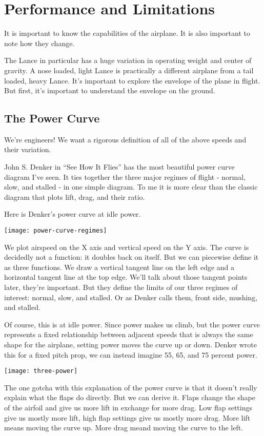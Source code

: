\chapter{Performance and Limitations}

It is important to know the capabilities of the airplane. It is also important to note how they change.

The Lance in particular has a huge variation in operating weight and center of gravity. A nose loaded, light Lance is practically a different airplane from a tail loaded, heavy Lance. It's important to explore the envelope of the plane in flight. But first, it's important to understand the envelope on the ground.


\section{The Power Curve}

We're engineers! We want a rigorous definition of all of the above speeds and their variation.

John S. Denker in ``See How It Flies'' has the most beautiful power curve diagram I've seen. It ties together the three major regimes of flight - normal, slow, and stalled - in one simple diagram. To me it is more clear than the classic diagram that plots lift, drag, and their ratio.

Here is Denker's power curve at idle power.

\texttt{[image: power-curve-regimes]}

We plot airspeed on the X axis and vertical speed on the Y axis. The curve is decidedly not a function: it doubles back on itself. But we can piecewise define it as three functions. We draw a vertical tangent line on the left edge and a horizontal tangent line at the top edge. We'll talk about those tangent points later, they're important. But they define the limits of our three regimes of interest: normal, slow, and stalled. Or as Denker calls them, front side, mushing, and stalled.

Of course, this is at idle power. Since power makes us climb, but the power curve represents a fixed relationship between adjacent speeds that is always the same shape for the airplane, setting power moves the curve up or down. Denker wrote this for a fixed pitch prop, we can instead imagine 55, 65, and 75 percent power.

\texttt{[image: three-power]}

The one gotcha with this explanation of the power curve is that it doesn't really explain what the flaps do directly. But we can derive it. Flaps change the shape of the airfoil and give us more lift in exchange for more drag. Low flap settings give us mostly more lift, high flap settings give us mostly more drag. More lift means moving the curve up. More drag meand moving the curve to the left.

